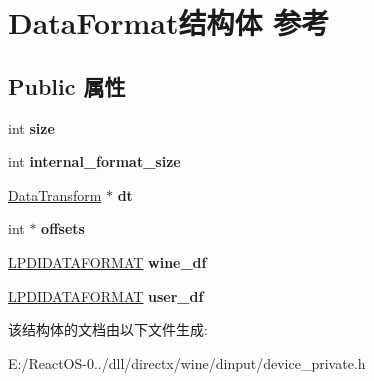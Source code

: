 \hypertarget{struct_data_format}{}\section{Data\+Format结构体 参考}
\label{struct_data_format}
\subsection*{Public 属性}
\begin{DoxyCompactItemize}
\item 
\mbox{\label{struct_data_format_ae1d1cd94eca7a1c8667c5079a0ab2625}} 
int {\bfseries size}
\item 
\mbox{\label{struct_data_format_aedd2fa6540a9e50ada88a0001f669845}} 
int {\bfseries internal\+\_\+format\+\_\+size}
\item 
\mbox{\label{struct_data_format_a519943986439df857517c654e58ee29c}} 
\hyperlink{struct_data_transform}{Data\+Transform} $\ast$ {\bfseries dt}
\item 
\mbox{\label{struct_data_format_a1db700b9678fa298aece9a68a99ed93d}} 
int $\ast$ {\bfseries offsets}
\item 
\mbox{\label{struct_data_format_a6ff75b15c5ee2c8c7f0d6c206e582d03}} 
\hyperlink{struct___d_i_d_a_t_a_f_o_r_m_a_t}{L\+P\+D\+I\+D\+A\+T\+A\+F\+O\+R\+M\+AT} {\bfseries wine\+\_\+df}
\item 
\mbox{\label{struct_data_format_aceebbbdc8c2b6446c2e2531b85842c7c}} 
\hyperlink{struct___d_i_d_a_t_a_f_o_r_m_a_t}{L\+P\+D\+I\+D\+A\+T\+A\+F\+O\+R\+M\+AT} {\bfseries user\+\_\+df}
\end{DoxyCompactItemize}


该结构体的文档由以下文件生成\+:\begin{DoxyCompactItemize}
\item 
E\+:/\+React\+O\+S-\/0../dll/directx/wine/dinput/device\+\_\+private.\+h\end{DoxyCompactItemize}
